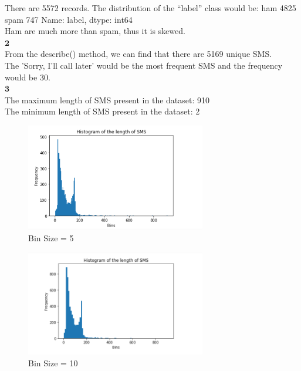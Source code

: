 \documentclass[12pt]{article}
\begin{document}
There are 5572 records. The distribution of the “label” class would be:
ham     4825
spam     747
Name: label, dtype: int64\\

Ham are much more than spam, thus it is skewed.\\

$\textbf{2}$\\

From the describe() method, we can find that there are 5169 unique SMS.\\

The 'Sorry, I'll call later' would be the most frequent SMS and the frequency would be 30.\\

$\textbf{3}$\\

The maximum length of SMS present in the dataset: 910\\

The minimum length of SMS present in the dataset: 2\\

\begin{figure}[H] 
\centering 
\includegraphics[width=0.7\textwidth]{histogram1} 
\caption{Bin Size = 5}
\end{figure}

\begin{figure}[H] 
\centering 
\includegraphics[width=0.7\textwidth]{histogram2} 
\caption{Bin Size = 10}
\end{figure}
\end{document}
